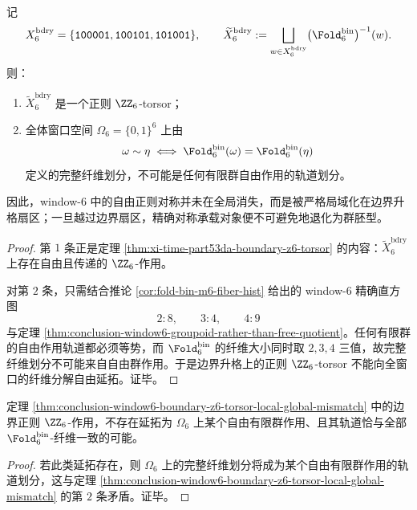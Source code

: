 \begin{theorem}\label{thm:conclusion-window6-boundary-z6-torsor-local-global-mismatch}
记
\[
X_6^{\mathrm{bdry}}=\{\texttt{100001},\texttt{100101},\texttt{101001}\},
\qquad
\widetilde X_6^{\mathrm{bdry}}
:=
\bigsqcup_{w\in X_6^{\mathrm{bdry}}}
\bigl(\Fold_6^{\mathrm{bin}}\bigr)^{-1}(w).
\]
则：
\begin{enumerate}
  \item \(\widetilde X_6^{\mathrm{bdry}}\) 是一个正则 \(\ZZ_6\)-torsor；
  \item 全体窗口空间 \(\Omega_6=\{0,1\}^6\) 上由
  \[
  \omega\sim\eta
  \iff
  \Fold_6^{\mathrm{bin}}(\omega)=\Fold_6^{\mathrm{bin}}(\eta)
  \]
  定义的完整纤维划分，不可能是任何有限群自由作用的轨道划分。
\end{enumerate}
因此，window-\(6\) 中的自由正则对称并未在全局消失，而是被严格局域化在边界升格扇区；一旦越过边界扇区，精确对称承载对象便不可避免地退化为群胚型。
\end{theorem}
\begin{proof}
第 \(1\) 条正是定理 \ref{thm:xi-time-part53da-boundary-z6-torsor} 的内容：\(\widetilde X_6^{\mathrm{bdry}}\) 上存在自由且传递的 \(\ZZ_6\)-作用。

对第 \(2\) 条，只需结合推论 \ref{cor:fold-bin-m6-fiber-hist} 给出的 window-\(6\) 精确直方图
\[
2:8,\qquad 3:4,\qquad 4:9
\]
与定理 \ref{thm:conclusion-window6-groupoid-rather-than-free-quotient}。任何有限群的自由作用轨道都必须等势，而 \(\Fold_6^{\mathrm{bin}}\) 的纤维大小同时取 \(2,3,4\) 三值，故完整纤维划分不可能来自自由群作用。于是边界升格上的正则 \(\ZZ_6\)-torsor 不能向全窗口的纤维分解自由延拓。证毕。
\end{proof}

\begin{corollary}\label{cor:conclusion-window6-boundary-z6-no-global-free-extension}
定理 \ref{thm:conclusion-window6-boundary-z6-torsor-local-global-mismatch} 中的边界正则 \(\ZZ_6\)-作用，不存在延拓为 \(\Omega_6\) 上某个自由有限群作用、且其轨道恰与全部 \(\Fold_6^{\mathrm{bin}}\)-纤维一致的可能。
\end{corollary}
\begin{proof}
若此类延拓存在，则 \(\Omega_6\) 上的完整纤维划分将成为某个自由有限群作用的轨道划分，这与定理 \ref{thm:conclusion-window6-boundary-z6-torsor-local-global-mismatch} 的第 \(2\) 条矛盾。证毕。
\end{proof}

